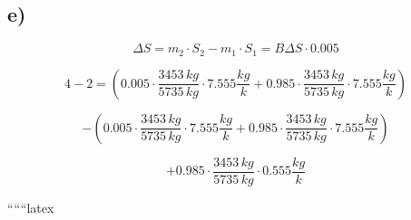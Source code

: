

\subsection*{e)}

\[
\Delta S = m_2 \cdot S_2 - m_1 \cdot S_1 = B \Delta S \cdot \boxed{0.005}
\]

\[
4-2 = (0.005 \cdot \frac{3453 \, kg}{5735 \, kg} \cdot 7.555 \frac{kg}{k} + 0.985 \cdot \frac{3453 \, kg}{5735 \, kg} \cdot 7.555 \frac{kg}{k})
\]

\[
- (0.005 \cdot \frac{3453 \, kg}{5735 \, kg} \cdot 7.555 \frac{kg}{k} + 0.985 \cdot \frac{3453 \, kg}{5735 \, kg} \cdot 7.555 \frac{kg}{k})
\]

\[
+ 0.985 \cdot \frac{3453 \, kg}{5735 \, kg} \cdot 0.555 \frac{kg}{k}
\]

``````latex
